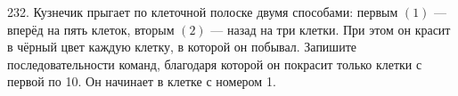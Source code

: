 232. Кузнечик прыгает по клеточной полоске двумя способами: первым $(1)$ --- вперёд на пять клеток, вторым $(2)$ --- назад на три клетки. При этом он красит в чёрный цвет каждую клетку,  в которой он побывал. Запишите последовательности команд, благодаря которой он покрасит только клетки с первой по 10. Он начинает в клетке с номером 1.\\
